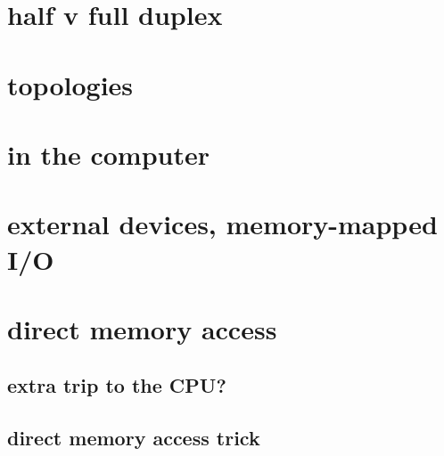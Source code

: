 \section{half v full duplex}



\section{topologies}




\section{in the computer}



\section{external devices, memory-mapped I/O}

\section{direct memory access}

\subsection{extra trip to the CPU?}



\subsection{direct memory access trick}

